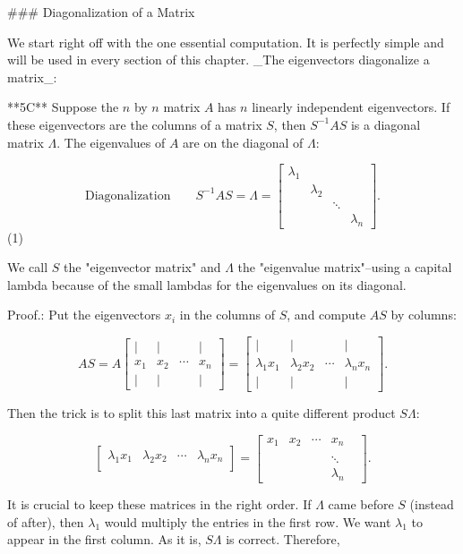 

### Diagonalization of a Matrix

We start right off with the one essential computation. It is perfectly simple and will be used in every section of this chapter. _The eigenvectors diagonalize a matrix_:

**5C** Suppose the \(n\) by \(n\) matrix \(A\) has \(n\) linearly independent eigenvectors. If these eigenvectors are the columns of a matrix \(S\), then \(S^{-1}AS\) is a diagonal matrix \(\Lambda\). The eigenvalues of \(A\) are on the diagonal of \(\Lambda\):

\[\text{Diagonalization}\qquad S^{-1}AS=\Lambda=\begin{bmatrix}\lambda_{1}&&\\ &\lambda_{2}&&\\ &&\ddots&\\ &&&\lambda_{n}\end{bmatrix}.\] (1)

We call \(S\) the "eigenvector matrix" and \(\Lambda\) the "eigenvalue matrix"--using a capital lambda because of the small lambdas for the eigenvalues on its diagonal.

Proof.: Put the eigenvectors \(x_{i}\) in the columns of \(S\), and compute \(AS\) by columns:

\[AS=A\begin{bmatrix}|&|&&|\\ x_{1}&x_{2}&\cdots&x_{n}\\ |&|&&|\end{bmatrix}=\begin{bmatrix}|&|&&|\\ \lambda_{1}x_{1}&\lambda_{2}x_{2}&\cdots&\lambda_{n}x_{n}\\ |&|&&|\end{bmatrix}.\]

Then the trick is to split this last matrix into a quite different product \(S\Lambda\):

\[\begin{bmatrix}\lambda_{1}x_{1}&\lambda_{2}x_{2}&\cdots&\lambda_{n}x_{n}\\ \end{bmatrix}=\begin{bmatrix}x_{1}&x_{2}&\cdots&x_{n}\\ &&\\ &&&\ddots&\\ &&&\lambda_{n}\end{bmatrix}.\]

It is crucial to keep these matrices in the right order. If \(\Lambda\) came before \(S\) (instead of after), then \(\lambda_{1}\) would multiply the entries in the first row. We want \(\lambda_{1}\) to appear in the first column. As it is, \(S\Lambda\) is correct. Therefore,

